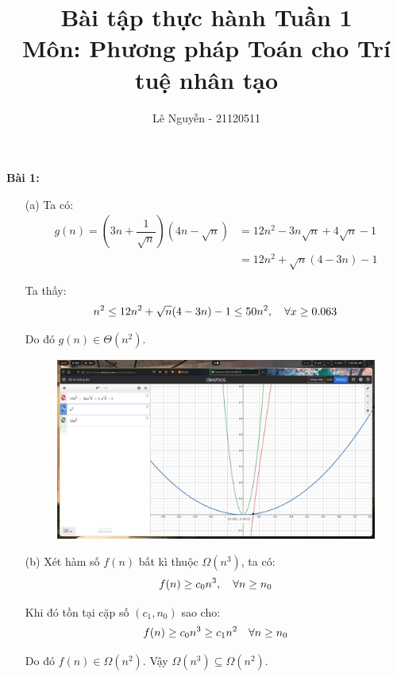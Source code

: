 \documentclass[12pt]{article}
\title{Bài tập thực hành Tuần 1\\
Môn: Phương pháp Toán cho Trí tuệ nhân tạo}
\author{Lê Nguyễn - 21120511}
\begin{document}
\maketitle

\textbf{Bài 1:}
\begin{itemize}
    \item[(a)] Ta có:
    $$
    \begin{aligned}
        g(n) = (3n + \dfrac{1}{\sqrt{n}})(4n - \sqrt{n}) &= 12n^2 - 3n\sqrt{n} + 4\sqrt{n} - 1 \\
        &= 12n^2 + \sqrt{n}(4 - 3n) - 1
    \end{aligned}
    $$

    \item[] Ta thấy:
    $$
    n^2 \leq 12n^2 + \sqrt{n}(4 - 3n) - 1 \leq 50n^2, \hspace*{10pt} \forall x \geq 0.063
    $$

    \item[] Do đó $g(n) \in \Theta(n^2)$.
    
    \begin{figure}[H]
        \centering
        \includegraphics[scale=0.23]{1677725662.png}
    \end{figure}


    \item[(b)] Xét hàm số $f(n)$ bất kì thuộc $\Omega(n^3)$, ta có:
    $$
    f(n) \geq c_0n^3, \hspace*{10pt} \forall n \geq n_0
    $$

    \item[] Khi đó tồn tại cặp số $(c_1, n_0)$ sao cho:
    $$
    f(n) \geq c_0n^3 \geq c_1n^2 \hspace*{10pt} \forall n \geq n_0
    $$

    \item[] Do đó $f(n) \in \Omega(n^2)$. Vậy $\Omega(n^3) \subseteq \Omega(n^2)$.
\end{itemize}
\vspace*{10pt}
\end{document}
